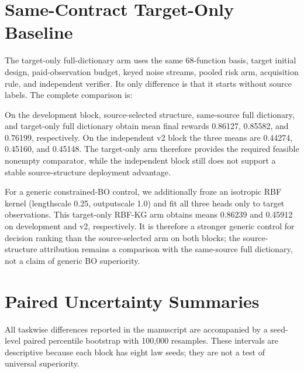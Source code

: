\documentclass[opre,dblanonrev]{informs4}
\begin{document}
\section{Same-Contract Target-Only Baseline}

The target-only full-dictionary arm uses the same 68-function basis, target
initial design, paid-observation budget, keyed noise streams, pooled risk arm,
acquisition rule, and independent verifier.  Its only difference is that it
starts without source labels.  The complete comparison is:

\begin{table}[h]
\centering
\caption{Same-contract target-only baseline.  Parentheses give certified tasks.}
\label{tab:mp_target_only}

\end{table}

On the development block, source-selected structure, same-source full
dictionary, and target-only full dictionary obtain mean final rewards 0.86127,
0.85582, and 0.76199, respectively.  On the independent v2 block the three
means are 0.44274, 0.45160, and 0.45148.  The target-only arm therefore provides
the required feasible nonempty comparator, while the independent block still
does not support a stable source-structure deployment advantage.

For a generic constrained-BO control, we additionally froze an isotropic RBF
kernel (lengthscale 0.25, outputscale 1.0) and fit all three heads only to
target observations.  This target-only RBF-KG arm obtains means 0.86239 and
0.45912 on development and v2, respectively.  It is therefore a stronger
generic control for decision ranking than the source-selected arm on both
blocks; the source-structure attribution remains a comparison with the
same-source full dictionary, not a claim of generic BO superiority.

\section{Paired Uncertainty Summaries}

All taskwise differences reported in the manuscript are accompanied by a
seed-level paired percentile bootstrap with 100,000 resamples.  These intervals
are descriptive because each block has eight law seeds; they are not a test of
universal superiority.

\begin{table}[h]
\centering
\caption{Paired bootstrap intervals for reported differences.}
\label{tab:mp_uncertainty}
\scriptsize

\end{table}
\end{document}
